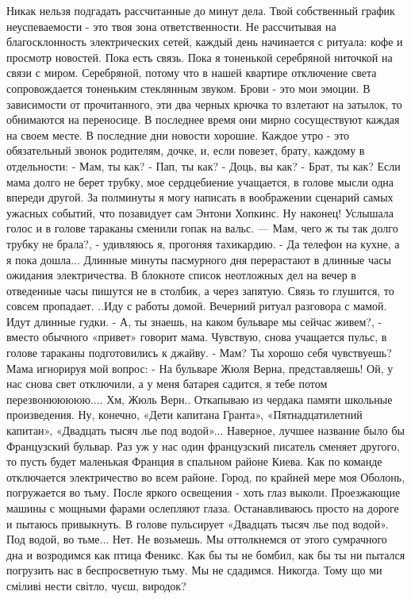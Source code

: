 \obeycr
Никак нельзя подгадать рассчитанные до минут дела. Твой собственный график неуспеваемости - это твоя зона ответственности.
Не рассчитывая на благосклонность электрических сетей, каждый день начинается с ритуала: кофе и просмотр новостей. Пока есть связь. Пока я тоненькой серебряной ниточкой на связи с миром. Серебряной, потому что в нашей квартире отключение света сопровождается тоненьким стеклянным звуком.
Брови - это мои эмоции. В зависимости от прочитанного, эти два черных крючка то взлетают на затылок, то обнимаются на переносице.
В последнее время они мирно сосуществуют каждая на своем месте. 
В последние дни новости хорошие.
Каждое утро - это обязательный звонок родителям, дочке, и, если повезет, брату, каждому в отдельности:
- Мам, ты как?
- Пап, ты как?
- Доць, вы как?
- Брат, ты как?
Если мама долго не берет трубку, мое сердцебиение учащается, в голове мысли одна впереди другой. За полминуты я могу написать в воображении сценарий самых ужасных событий, что позавидует сам Энтони Хопкинс.
Ну наконец! Услышала голос и в голове тараканы сменили гопак на вальс.
— Мам, чего ж ты так долго трубку не брала?, - удивляюсь я, прогоняя тахикардию. 
- Да телефон на кухне, а я пока дошла... 
Длинные минуты пасмурного дня перерастают в длинные часы ожидания электричества. 
В блокноте список неотложных дел на вечер в отведенные часы пишутся не в столбик, а через запятую. 
Связь то глушится, то совсем пропадает. 
..Иду с работы домой. 
Вечерний ритуал разговора с мамой. Идут длинные гудки. 
- А, ты знаешь, на каком бульваре мы сейчас живем?, - вместо обычного «привет» говорит мама.
Чувствую, снова учащается пульс, в голове тараканы подготовились к джайву.
- Мам? Ты хорошо себя чувствуешь?
Мама игнорируя мой вопрос: 
- На бульваре Жюля Верна, представляешь! Ой, у нас снова свет отключили, а у меня батарея садится, я тебе потом перезвонююююю....
Хм, Жюль Верн.. Откапываю из чердака памяти школьные произведения. Ну, конечно, «Дети капитана Гранта», «Пятнадцатилетний капитан», «Двадцать тысяч лье под водой»...
Наверное, лучшее название было бы Французский бульвар. Раз уж у нас один французский писатель сменяет другого, то пусть будет маленькая Франция в спальном районе Киева.
Как по команде отключается электричество во всем районе. Город, по крайней мере моя Оболонь, погружается во тьму. 
После яркого освещения - хоть глаз выколи. Проезжающие машины с мощными фарами ослепляют глаза. Останавливаюсь просто на дороге и пытаюсь привыкнуть. 
В голове пульсирует «Двадцать тысяч лье под водой». Под водой, во тьме...
Нет. Не возьмешь. Мы оттолкнемся от этого сумрачного дна и возродимся как птица Феникс. Как бы ты не бомбил, как бы ты ни пытался погрузить нас в беспросветную тьму. 
Мы не сдадимся. 
Никогда. 
Тому що ми сміливі нести світло, чуєш, виродок?
\restorecr

